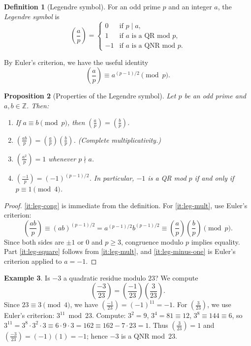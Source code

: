\documentclass[12pt,a4paper,openany]{book}
\theoremstyle{definition}
\newtheorem{definition}{Definition}[chapter]
\newtheorem{example}[definition]{Example}
\theoremstyle{plain}
\newtheorem{proposition}[definition]{Proposition}
\theoremstyle{remark}
\newcommand{\Z}{\mathbb{Z}}
\newcommand{\legendre}[2]{\left(\frac{#1}{#2}\right)}
\begin{document}
\begin{definition}[Legendre symbol]
\label{def:legendre}
For an odd prime $p$ and an integer $a$, the \emph{Legendre symbol} is
\[
  \legendre{a}{p} =
  \begin{cases}
    0  & \text{if } p \mid a, \\
    1  & \text{if } a \text{ is a QR mod } p, \\
    -1 & \text{if } a \text{ is a QNR mod } p.
  \end{cases}
\]
\end{definition}

By Euler's criterion, we have the useful identity
\begin{equation}
\label{eq:legendre-euler}
  \legendre{a}{p} \equiv a^{(p-1)/2} \pmod{p}.
\end{equation}

\begin{proposition}[Properties of the Legendre symbol]
\label{prop:legendre-properties}
Let $p$ be an odd prime and $a, b \in \Z$. Then:
\begin{enumerate}[label=\textup{(\roman*)}]
  \item \label{it:leg-cong}
    If $a \equiv b \pmod{p}$, then $\legendre{a}{p} = \legendre{b}{p}$.
  \item \label{it:leg-mult}
    $\legendre{ab}{p} = \legendre{a}{p} \legendre{b}{p}$.
    \textup{(}Complete multiplicativity.\textup{)}
  \item \label{it:leg-square}
    $\legendre{a^2}{p} = 1$ whenever $p \nmid a$.
  \item \label{it:leg-minus-one}
    $\legendre{-1}{p} = (-1)^{(p-1)/2}$.
    In particular, $-1$ is a QR mod $p$ if and only if $p \equiv 1 \pmod{4}$.
\end{enumerate}
\end{proposition}

\begin{proof}
\ref{it:leg-cong} is immediate from the definition. For \ref{it:leg-mult},
use Euler's criterion:
\[
  \legendre{ab}{p} \equiv (ab)^{(p-1)/2} = a^{(p-1)/2} b^{(p-1)/2}
  \equiv \legendre{a}{p} \legendre{b}{p} \pmod{p}.
\]
Since both sides are $\pm 1$ or $0$ and $p \geq 3$, congruence modulo $p$
implies equality.
Part \ref{it:leg-square} follows from \ref{it:leg-mult}, and
\ref{it:leg-minus-one} is Euler's criterion applied to $a = -1$.
\end{proof}

\begin{example}
\label{ex:legendre-computation}
Is $-3$ a quadratic residue modulo $23$?
We compute
\[
  \legendre{-3}{23} = \legendre{-1}{23}\legendre{3}{23}.
\]
Since $23 \equiv 3 \pmod{4}$, we have $\legendre{-1}{23} = (-1)^{11} = -1$.
For $\legendre{3}{23}$, we use Euler's criterion: $3^{11} \bmod 23$.
Compute: $3^2 = 9$, $3^4 = 81 \equiv 12$, $3^8 \equiv 144 \equiv 6$,
so $3^{11} = 3^8 \cdot 3^2 \cdot 3 \equiv 6 \cdot 9 \cdot 3 = 162 \equiv 162 - 7 \cdot 23 = 1$.
Thus $\legendre{3}{23} = 1$ and $\legendre{-3}{23} = (-1)(1) = -1$; hence $-3$ is a QNR mod~$23$.
\end{example}
\end{document}
